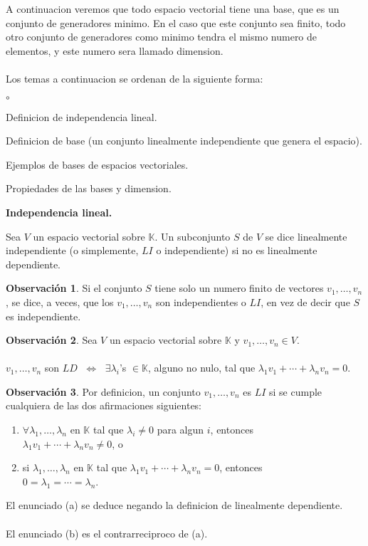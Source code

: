 \documentclass{article}
\theoremstyle{definition}
\theoremstyle{definition}
\newtheorem*{obs}{Observación}
\theoremstyle{remark}
\begin{document}
\pagebreak
A continuacion veremos que todo espacio vectorial tiene una base, que es un conjunto de generadores minimo. En el caso que este conjunto sea finito, todo otro conjunto de generadores como minimo tendra el mismo numero de elementos, y este numero sera llamado dimension. \\\\ Los temas a continuacion se ordenan de la siguiente forma: 
\begin{list}{$\circ$}{}  
\item Definicion de independencia lineal. 
\item Definicion de base (un conjunto linealmente independiente que genera el espacio).
\item Ejemplos de bases de espacios vectoriales. 
\item Propiedades de las bases y dimension.
\end{list}
\begin{center}
\textbf{Independencia lineal.}
\end{center}
\begin{defi}
 Sea $V$ un espacio vectorial sobre $\mathbb{K}$. Un subconjunto $S$ de $V$ se dice linealmente independiente (o simplemente, $LI$ o independiente) si no es linealmente dependiente.
\end{defi}
\begin{obs}
  Si el conjunto $S$ tiene solo un numero finito de vectores $v_1, \dots ,v_n$, se dice, a veces, que los $v_1, \dots ,v_n$ son independientes o $LI$, en vez de decir que $S$ es independiente.
\end{obs}
\begin{obs}
  Sea $V$ un espacio vectorial sobre $\mathbb{K}$ y $v_1, \dots ,v_n \in V$. \\\\ $v_1, \dots ,v_n$ son $LD$ $\;\Leftrightarrow\;$ $\exists \lambda_i$'s $\in \mathbb{K}$, alguno no nulo, tal que $\lambda_1 v_1 + \cdots + \lambda_n v_n = 0$.
\end{obs}
\begin{obs}
  Por definicion, un conjunto $v_1, \dots ,v_n$ es $LI$ si se cumple cualquiera de las dos afirmaciones siguientes: \begin{enumerate}[label=(\alph*)]
    \item $\forall \lambda_1 , \dots ,\lambda_n$ en $\mathbb{K}$ tal que $\lambda_i \neq 0$ para algun $i$, entonces\\ $\lambda_1 v_1 + \cdots + \lambda_n v_n \neq 0$, o 
    \item si $\lambda_1, \dots ,\lambda_n$ en $\mathbb{K}$ tal que $\lambda_1 v_1 + \cdots + \lambda_n v_n = 0$, entonces\\ $0 = \lambda_1 = \cdots = \lambda_n$.
  \end{enumerate}
  El enunciado (a) se deduce negando la definicion de linealmente dependiente. \\\\ El enunciado (b) es el contrarreciproco de (a).
\end{obs}\pagebreak
\end{document}
